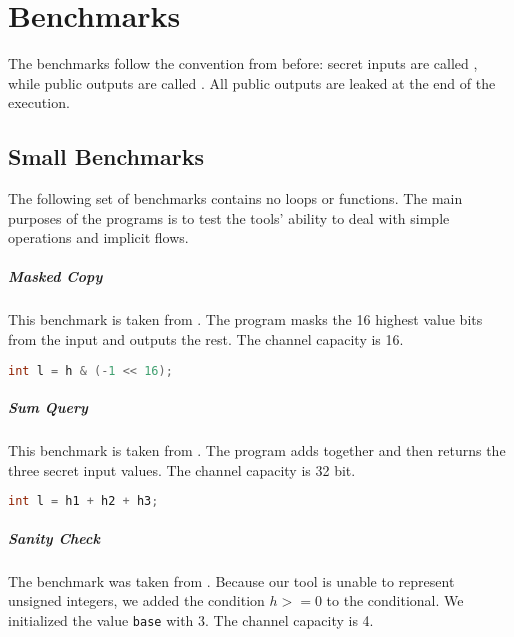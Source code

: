 \chapter{Benchmarks}
The benchmarks follow the convention from before: secret inputs are called \In, while public outputs are called \Out. All public outputs are leaked at the end of the execution.

\section{Small Benchmarks}
The following set of benchmarks contains no loops or functions. The main purposes of the programs is to test the tools' ability to deal with simple operations and implicit flows.

\paragraph{Masked Copy}
This benchmark is taken from \cite{meng11}. The program masks the 16 highest value bits from the input and outputs the rest. The channel capacity is 16.

\begin{center}
    \begin{lstlisting}[language=C, caption=Masked Copy]
        int l = h & (-1 << 16);
    \end{lstlisting}
\end{center}


\paragraph{Sum Query}
This benchmark is taken from \cite{backes09}. The program adds together and then returns the three secret input values. The channel capacity is 32 bit.

\begin{center}
    \begin{lstlisting}[language=C, caption=Sum Query]
        int l = h1 + h2 + h3;
    \end{lstlisting}
\end{center}

\paragraph{Sanity Check}
The benchmark was taken from \cite{newsome09}. Because our tool is unable to represent unsigned integers, we added the condition $h >= 0$ to the conditional. We initialized the value \texttt{base} with 3. The channel capacity is 4.


